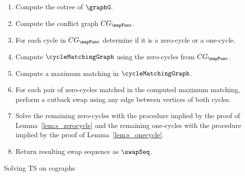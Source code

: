 \begin{algorithm}[H]
    \vspace{10pt}

    \KwIn{$\graphG, \mapFunc$}

    \vspace{10pt}
    \begin{enumerate}
        \item Compute the cotree of $\graphG$.
        \item Compute the conflict graph  $CG_\mapFunc$.
        \item For each cycle in $CG_\mapFunc$ determine if it is a zero-cycle or a one-cycle.
        \item Compute $\cycleMatchingGraph$ using the zero-cycles from $CG_\mapFunc$.
        \item Compute a maximum matching in $\cycleMatchingGraph$.
        \item For each pair of zero-cycles matched in the computed maximum matching, perform a cutback swap using any edge between vertices of both cycles.
        \item Solve the remaining zero-cycles with the procedure implied by the proof of  Lemma~\ref{lem:s_zerocycle} and the remaining one-cycles with the procedure implied by the proof of Lemma~\ref{lem:s_onecycle}.
        \item Return resulting swap sequence as $\swapSeq$.
    \end{enumerate}
    \caption{Solving TS on cographs}
    \label{alg:final}
\end{algorithm}